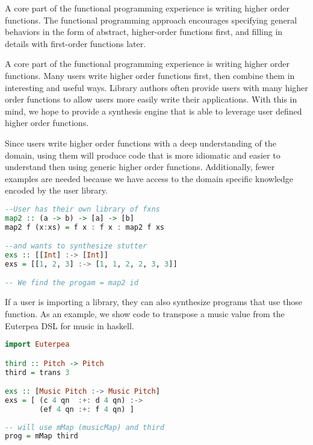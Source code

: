 A core part of the functional programming experience is writing higher order functions. The functional programming approach encourages specifying general behaviors in the form of abstract, higher-order functions first, and filling in details with first-order functions later.

A core part of the functional programming experience is writing higher order functions. Many users write higher order functions first, then combine them in interesting and useful ways. Library authors often provide users with many higher order functions to allow users more easily write their applications. With this in mind, we hope to provide a synthesis engine that is able to leverage user defined higher order functions.

Since users write higher order functions with a deep understanding of the domain, using them will produce code that is more idiomatic and easier to understand then using generic higher order functions. Additionally, fewer examples are needed because we have access to the domain specific knowledge encoded by the user library.

\begin{lstlisting}[language=haskell]
--User has their own library of fxns
map2 :: (a -> b) -> [a] -> [b]
map2 f (x:xs) = f x : f x : map2 f xs

--and wants to synthesize stutter
exs :: [[Int] :-> [Int]]
exs = [[1, 2, 3] :-> [1, 1, 2, 2, 3, 3]]

-- We find the progam = map2 id
\end{lstlisting}


If a user is importing a library, they can also synthesize programs that use those function. As an example, we show code to transpose a music value from the Euterpea DSL for music in haskell.

\begin{lstlisting}[language=haskell]
import Euterpea

third :: Pitch -> Pitch
third = trans 3

exs :: [Music Pitch :-> Music Pitch]
exs = [ (c 4 qn  :+: d 4 qn) :->
        (ef 4 qn :+: f 4 qn) ]
        
-- will use mMap (musicMap) and third
prog = mMap third
\end{lstlisting}
